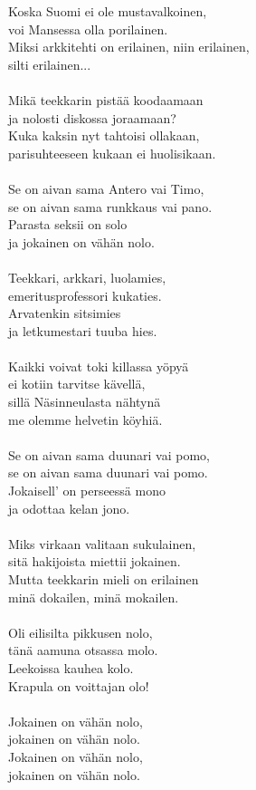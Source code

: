 
Koska Suomi ei ole mustavalkoinen, \\ voi Mansessa olla porilainen. \\ Miksi arkkitehti on erilainen, niin erilainen, \\ silti erilainen... \\ \hspace{10mm} \\ Mikä teekkarin pistää koodaamaan \\ ja nolosti diskossa joraamaan? \\ Kuka kaksin nyt tahtoisi ollakaan, \\ parisuhteeseen kukaan ei huolisikaan. \\ \hspace{10mm} \\ Se on aivan sama Antero vai Timo, \\ se on aivan sama runkkaus vai pano. \\ Parasta seksii on solo \\ ja jokainen on vähän nolo. \\ \hspace{10mm} \\ Teekkari, arkkari, luolamies, \\ emeritusprofessori kukaties. \\ Arvatenkin sitsimies \\ ja letkumestari tuuba hies. \\ \hspace{10mm} \\ Kaikki voivat toki killassa yöpyä \\ ei kotiin tarvitse kävellä, \\ sillä Näsinneulasta nähtynä \\ me olemme helvetin köyhiä. \\ \hspace{10mm} \\ Se on aivan sama duunari vai pomo, \\ se on aivan sama duunari vai pomo. \\ Jokaisell' on perseessä mono \\ ja odottaa kelan jono. \\ \hspace{10mm} \\ Miks virkaan valitaan sukulainen, \\ sitä hakijoista miettii jokainen. \\ Mutta teekkarin mieli on erilainen \\ minä dokailen, minä mokailen. \\ \hspace{10mm} \\ Oli eilisilta pikkusen nolo, \\ tänä aamuna otsassa molo. \\ Leekoissa kauhea kolo. \\ Krapula on voittajan olo! \\ \hspace{10mm} \\ Jokainen on vähän nolo, \\ jokainen on vähän nolo. \\ Jokainen on vähän nolo, \\ jokainen on vähän nolo.